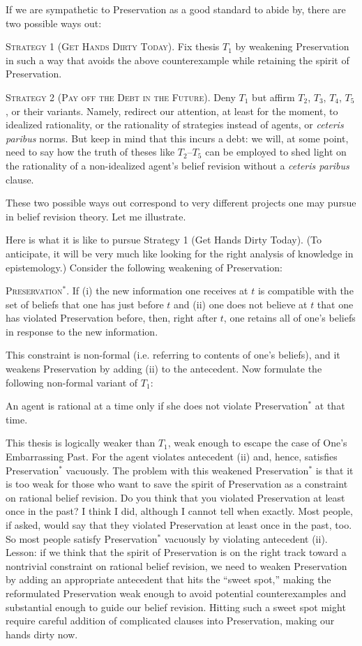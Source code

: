 If we are sympathetic to Preservation as a good standard to abide by, there are two possible ways out: \op

	\xm \textsc{Strategy 1 (Get Hands Dirty Today).} Fix thesis $T_1$ by weakening Preservation in such a way that avoids the above counterexample while retaining the spirit of Preservation.

	\xm \textsc{Strategy 2 (Pay off the Debt in the Future).} Deny $T_1$ but affirm $T_2$, $T_3$, $T_4$, $T_5$, or their variants. Namely, redirect our attention, at least for the moment, to idealized rationality, or the rationality of strategies instead of agents, or {\em ceteris paribus} norms. But keep in mind that this incurs a debt: we will, at some point, need to say how the truth of theses like $T_2$--$T_5$ can be employed to shed light on the rationality of a non-idealized agent's belief revision without a {\em ceteris paribus} clause.

\ed These two possible ways out correspond to very different projects one may pursue in belief revision theory. Let me illustrate.

Here is what it is like to pursue Strategy 1 (Get Hands Dirty Today). (To anticipate, it will be very much like looking for the right analysis of knowledge in epistemology.) Consider the following weakening of Preservation: \op

	\xm \textsc{Preservation$^{*}$.} If (i) the new information one receives at $t$ is compatible with the set of beliefs that one has just before $t$ and (ii) one does not believe at $t$ that one has violated Preservation before, then, right after $t$, one retains all of one's beliefs in response to the new information. 

\ed This constraint is non-formal (i.e. referring to contents of one's beliefs), and it weakens Preservation by adding (ii) to the antecedent. Now formulate the following non-formal variant of $T_1$: \op

	\xm 
	\op
	\im[($T^{*}_1$)] An agent is rational at a time only if she does not violate Preservation$^{*}$ at that time.
	\ed

\ed This thesis is logically weaker than $T_1$, weak enough to escape the case of One's Embarrassing Past. For the agent violates antecedent (ii) and, hence, satisfies Preservation$^{*}$ vacuously. The problem with this weakened Preservation$^{*}$ is that it is too weak for those who want to save the spirit of Preservation as a constraint on rational belief revision. Do you think that you violated Preservation at least once in the past? I think I did, although I cannot tell when exactly. Most people, if asked, would say that they violated Preservation at least once in the past, too. So most people satisfy Preservation$^{*}$ vacuously by violating antecedent (ii). Lesson: if we think that the spirit of Preservation is on the right track toward a nontrivial constraint on rational belief revision, we need to weaken Preservation by adding an appropriate antecedent that hits the ``sweet spot,'' making the reformulated Preservation weak enough to avoid potential counterexamples and substantial enough to guide our belief revision. Hitting such a sweet spot might require careful addition of complicated clauses into Preservation, making our hands dirty now.

